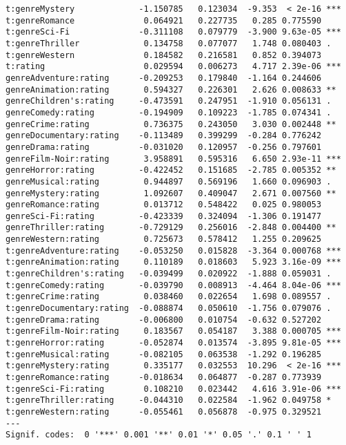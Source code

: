 \begin{verbatim}
t:genreMystery             -1.150785   0.123034  -9.353  < 2e-16 ***
t:genreRomance              0.064921   0.227735   0.285 0.775590
t:genreSci-Fi              -0.311108   0.079779  -3.900 9.63e-05 ***
t:genreThriller             0.134758   0.077077   1.748 0.080403 .
t:genreWestern              0.184582   0.216581   0.852 0.394073
t:rating                    0.029594   0.006273   4.717 2.39e-06 ***
genreAdventure:rating      -0.209253   0.179840  -1.164 0.244606
genreAnimation:rating       0.594327   0.226301   2.626 0.008633 **
genreChildren's:rating     -0.473591   0.247951  -1.910 0.056131 .
genreComedy:rating         -0.194909   0.109223  -1.785 0.074341 .
genreCrime:rating           0.736375   0.243050   3.030 0.002448 **
genreDocumentary:rating    -0.113489   0.399299  -0.284 0.776242
genreDrama:rating          -0.031020   0.120957  -0.256 0.797601
genreFilm-Noir:rating       3.958891   0.595316   6.650 2.93e-11 ***
genreHorror:rating         -0.422452   0.151685  -2.785 0.005352 **
genreMusical:rating         0.944897   0.569196   1.660 0.096903 .
genreMystery:rating         1.092607   0.409047   2.671 0.007560 **
genreRomance:rating         0.013712   0.548422   0.025 0.980053
genreSci-Fi:rating         -0.423339   0.324094  -1.306 0.191477
genreThriller:rating       -0.729129   0.256016  -2.848 0.004400 **
genreWestern:rating         0.725673   0.578412   1.255 0.209625
t:genreAdventure:rating    -0.053250   0.015828  -3.364 0.000768 ***
t:genreAnimation:rating     0.110189   0.018603   5.923 3.16e-09 ***
t:genreChildren's:rating   -0.039499   0.020922  -1.888 0.059031 .
t:genreComedy:rating       -0.039790   0.008913  -4.464 8.04e-06 ***
t:genreCrime:rating         0.038460   0.022654   1.698 0.089557 .
t:genreDocumentary:rating  -0.088874   0.050610  -1.756 0.079076 .
t:genreDrama:rating        -0.006800   0.010754  -0.632 0.527202
t:genreFilm-Noir:rating     0.183567   0.054187   3.388 0.000705 ***
t:genreHorror:rating       -0.052874   0.013574  -3.895 9.81e-05 ***
t:genreMusical:rating      -0.082105   0.063538  -1.292 0.196285
t:genreMystery:rating       0.335177   0.032553  10.296  < 2e-16 ***
t:genreRomance:rating      -0.018634   0.064877  -0.287 0.773939
t:genreSci-Fi:rating        0.108210   0.023442   4.616 3.91e-06 ***
t:genreThriller:rating     -0.044310   0.022584  -1.962 0.049758 *
t:genreWestern:rating      -0.055461   0.056878  -0.975 0.329521
---
Signif. codes:  0 '***' 0.001 '**' 0.01 '*' 0.05 '.' 0.1 ' ' 1
\end{verbatim}

